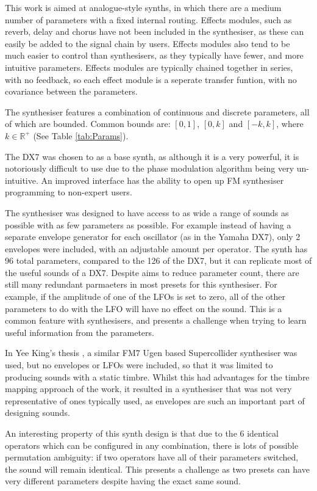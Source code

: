 \documentclass[11pt, oneside]{report}   	%
\begin{document}
This work is aimed at analogue-style synths, in which there are a medium number of parameters with a fixed internal routing. Effects modules, such as reverb, delay and chorus have not been included in the synthesiser, as these can easily be added to the signal chain by users. Effects modules also tend to be much easier to control than synthesisers, as they typically have fewer, and more intuitive parameters. Effects modules are typically chained together in series, with no feedback, so each effect module is a seperate transfer funtion, with no covariance between the parameters.

The synthesiser features a combination of continuous and discrete parameters, all of which are bounded. Common bounds are: $[0, 1]$, $[0, k]$ and $[-k, k]$, where $k \in \mathbb{R}^+ $ (See Table \ref{tab:Params}).

The DX7 was chosen to as a base synth, as although it is a very powerful, it is notoriously difficult to use due to the phase modulation algorithm being very un-intuitive. An improved interface has the ability to open up FM synthesiser programming to non-expert users. %

The synthesiser was designed to have access to as wide a range of sounds as possible with as few parameters as possible. For example instead of having a separate envelope generator for each oscillator (as in the Yamaha DX7), only 2 envelopes were included, with an adjustable amount per operator. The synth has 96 total parameters, compared to the 126 of the DX7, but it can replicate most of the useful sounds of a DX7. Despite aims to reduce parameter count, there are still many redundant parmaeters in most presets for this synthesiser. For example, if the amplitude of one of the LFOs is set to zero, all of the other parameters to do with the LFO will have no effect on the sound. This is a common feature with synthesisers, and presents a challenge when trying to learn useful information from the parameters.

In Yee King's thesis \cite{YeeKing}, a similar FM7 Ugen based Supercollider synthesiser was used, but no envelopes or LFOs were included, so that it was limited to producing sounds with a static timbre. Whilst this had advantages for the timbre mapping approach of the work, it resulted in a synthesiser that was not very representative of ones typically used, as envelopes are such an important part of designing sounds. 

An interesting property of this synth design is that due to the 6 identical operators which can be configured in any combination, there is lots of possible permutation ambiguity: if two operators have all of their parameters switched, the sound will remain identical. This presents a challenge as two presets can have very different parameters despite having the exact same sound. 
\end{document}
